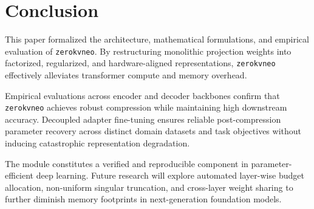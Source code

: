 \section{Conclusion}
This paper formalized the architecture, mathematical formulations, and empirical evaluation of \texttt{zerokvneo}. By restructuring monolithic projection weights into factorized, regularized, and hardware-aligned representations, \texttt{zerokvneo} effectively alleviates transformer compute and memory overhead.

Empirical evaluations across encoder and decoder backbones confirm that \texttt{zerokvneo} achieves robust compression while maintaining high downstream accuracy. Decoupled adapter fine-tuning ensures reliable post-compression parameter recovery across distinct domain datasets and task objectives without inducing catastrophic representation degradation.

The module constitutes a verified and reproducible component in parameter-efficient deep learning. Future research will explore automated layer-wise budget allocation, non-uniform singular truncation, and cross-layer weight sharing to further diminish memory footprints in next-generation foundation models.
